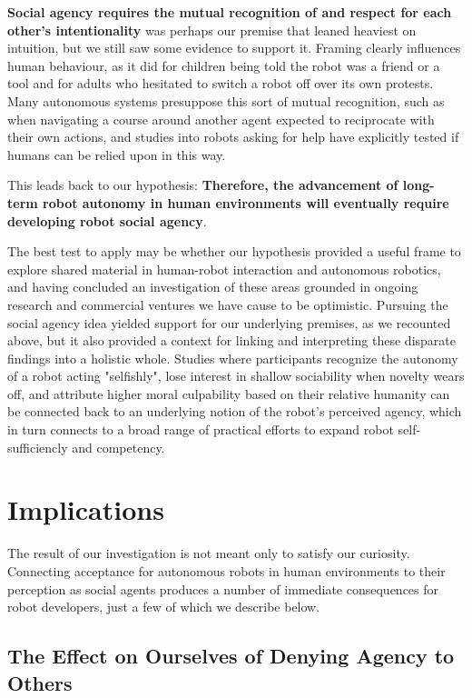 \documentclass{sfuthesis}
\begin{document}
\textbf{Social agency requires the mutual recognition of and respect for each other's intentionality} was perhaps our premise that leaned heaviest on intuition, but we still saw some evidence to support it. Framing clearly influences human behaviour, as it did for children being told the robot was a friend or a tool and for adults who hesitated to switch a robot off over its own protests. Many autonomous systems presuppose this sort of mutual recognition, such as when navigating a course around another agent expected to reciprocate with their own actions, and studies into robots asking for help have explicitly tested if humans can be relied upon in this way.

This leads back to our hypothesis: \textbf{Therefore, the advancement of long-term robot autonomy in human environments will eventually require developing robot social agency}.

The best test to apply may be whether our hypothesis provided a useful frame to explore shared material in human-robot interaction and autonomous robotics, and having concluded an investigation of these areas grounded in ongoing research and commercial ventures we have cause to be optimistic. Pursuing the social agency idea yielded support for our underlying premises, as we recounted above, but it also provided a context for linking and interpreting these disparate findings into a holistic whole. Studies where participants recognize the autonomy of a robot acting "selfishly", lose interest in shallow sociability when novelty wears off, and attribute higher moral culpability based on their relative humanity can be connected back to an underlying notion of the robot's perceived agency, which in turn connects to a broad range of practical efforts to expand robot self-sufficiencly and competency. 

\section{Implications}

The result of our investigation is not meant only to satisfy our curiosity. Connecting acceptance for autonomous robots in human environments to their perception as social agents produces a number of immediate consequences for robot developers, just a few of which we describe below. 

\subsection{The Effect on Ourselves of Denying Agency to Others}
\end{document}
